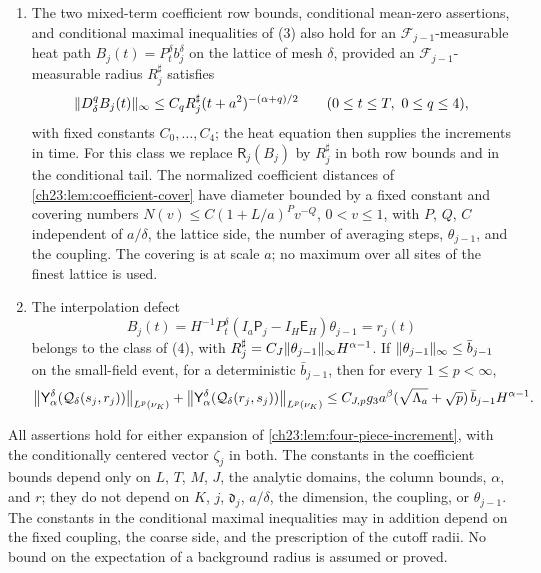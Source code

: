 \begin{theorem}
\begin{enumerate}
\[\]
The sum $\mathcal B_\delta(B_j,s_j)$ of the two orders satisfies the same estimate with a larger $C_J$.
\item The two mixed-term coefficient row bounds, conditional mean-zero assertions, and conditional maximal inequalities of (3) also hold for an $\mathcal F_{j-1}$-measurable heat path $B_j(t)=P_t^\delta b_j^\delta$ on the lattice of mesh $\delta$, provided an $\mathcal F_{j-1}$-measurable radius $R_j^\sharp$ satisfies
\[
 \lVert D_\delta^qB_j(t)\rVert_\infty\le C_qR_j^\sharp(t+a^2)^{-(\alpha+q)/2}\qquad(0\le t\le T,\ 0\le q\le4),
\]
with fixed constants $C_0,\dots,C_4$; the heat equation then supplies the increments in time. For this class we replace $\mathsf R_j(B_j)$ by $R_j^\sharp$ in both row bounds and in the conditional tail. The normalized coefficient distances of \cref{ch23:lem:coefficient-cover} have diameter bounded by a fixed constant and covering numbers $N(v)\le C(1+L/a)^Pv^{-Q}$, $0<v\le1$, with $P$, $Q$, $C$ independent of $a/\delta$, the lattice side, the number of averaging steps, $\theta_{j-1}$, and the coupling. The covering is at scale $a$; no maximum over all sites of the finest lattice is used.
\item The interpolation defect
\[
 B_j(t)=H^{-1}P_t^\delta(I_a\mathsf P_j-I_H\mathsf E_H)\theta_{j-1}=r_j(t)
\]
belongs to the class of (4), with $R_j^\sharp=C_J\lVert \theta_{j-1}\rVert_\infty H^{\alpha-1}$. If $\lVert \theta_{j-1}\rVert_\infty\le\bar b_{j-1}$ on the small-field event, for a deterministic $\bar b_{j-1}$, then for every $1\le p<\infty$,
\[
 \bigl\|\mathsf Y_{\alpha}^{\delta}(\mathcal Q_\delta(s_j,r_j))\bigr\|_{L^p(\nu_K)}+\bigl\|\mathsf Y_{\alpha}^{\delta}(\mathcal Q_\delta(r_j,s_j))\bigr\|_{L^p(\nu_K)}
 \le C_{J,p}g_3a^\beta(\sqrt{\Lambda_a}+\sqrt p)\,\bar b_{j-1}H^{\alpha-1}.
\]
\end{enumerate}
All assertions hold for either expansion of \cref{ch23:lem:four-piece-increment}, with the conditionally centered vector $\zeta_j$ in both. The constants in the coefficient bounds depend only on $L$, $T$, $M$, $J$, the analytic domains, the column bounds, $\alpha$, and $r$; they do not depend on $K$, $j$, $\mathfrak d_j$, $a/\delta$, the dimension, the coupling, or $\theta_{j-1}$. The constants in the conditional maximal inequalities may in addition depend on the fixed coupling, the coarse side, and the prescription of the cutoff radii. No bound on the expectation of a background radius is assumed or proved.
\end{theorem}

